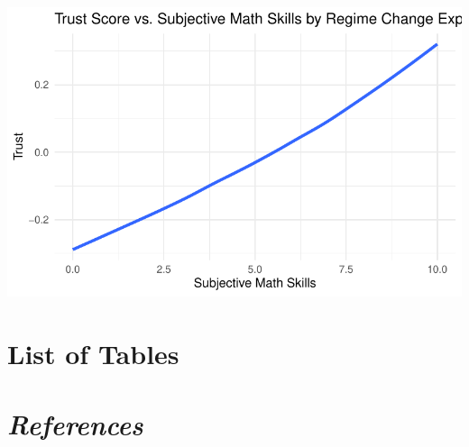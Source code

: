 \documentclass[
  letterpaper,
  DIV=11,
  numbers=noendperiod]{scrartcl}
\begin{document}
\includegraphics{Milestone-2-Data_files/figure-pdf/unnamed-chunk-4-1.pdf}

\hypertarget{list-of-tables}{%
\section{List of Tables}\label{list-of-tables}}

\hypertarget{references}{%
\section{\texorpdfstring{\emph{References}}{References}}\label{references}}
\end{document}
